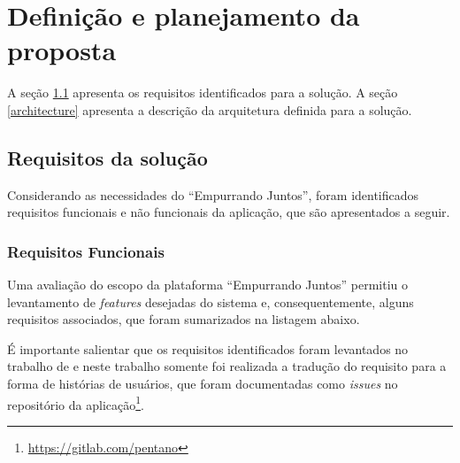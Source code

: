 \chapter{Definição e planejamento da proposta} \label{cap:proposta}

 A seção \ref{requirements} apresenta os requisitos identificados para a solução.
 A seção \ref{architecture} apresenta a descrição da arquitetura definida para a solução.

\section{Requisitos da solução} \label{requirements}

    Considerando as necessidades do ``Empurrando Juntos'',
    foram identificados requisitos funcionais e não funcionais da aplicação,
    que são apresentados a seguir.

    \subsection*{Requisitos Funcionais} \label{functional_requirements}

    Uma avaliação do escopo da plataforma ``Empurrando Juntos'' permitiu o levantamento de \textit{features} desejadas do sistema e,
    consequentemente, alguns requisitos associados, que foram sumarizados na listagem abaixo.
    
    É importante salientar que os requisitos identificados foram levantados no trabalho de 
    e neste trabalho somente foi realizada a tradução do requisito para a forma de histórias de usuários, que
    foram documentadas como \textit{issues} no repositório
    da aplicação\footnote{\href{https://gitlab.com/pentano}{https://gitlab.com/pentano}}.

